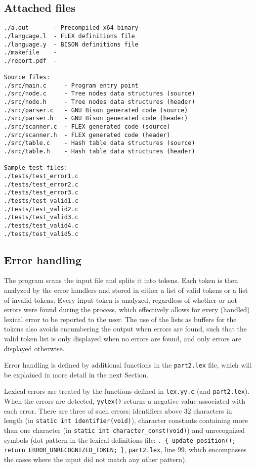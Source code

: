 \documentclass[12pt]{article}
\begin{document}
\subsection{Attached files}
\begin{lstlisting}
./a.out       - Precompiled x64 binary
./language.l  - FLEX definitions file
./language.y  - BISON definitions file
./makefile    - 
./report.pdf  - 

Source files:
./src/main.c     - Program entry point
./src/node.c     - Tree nodes data structures (source)
./src/node.h     - Tree nodes data structures (header)
./src/parser.c   - GNU Bison generated code (source)
./src/parser.h   - GNU Bison generated code (header)
./src/scanner.c  - FLEX generated code (source)
./src/scanner.h  - FLEX generated code (header)
./src/table.c    - Hash table data structures (source)
./src/table.h    - Hash table data structures (header)

Sample test files:
./tests/test_error1.c
./tests/test_error2.c
./tests/test_error3.c
./tests/test_valid1.c
./tests/test_valid2.c
./tests/test_valid3.c
./tests/test_valid4.c
./tests/test_valid5.c
\end{lstlisting}


\subsection{Error handling}
The program scans the input file and splits it into tokens. Each token is then analyzed
by the error handlers and stored in either a list of valid tokens or a list of invalid tokens.
Every input token is analyzed, regardless of whether or not errors were found during the process,
which effectively allows for every (handled) lexical error to be reported to the user. The use
of the lists as buffers for the tokens also avoids encumbering the output when errors are found, such
that the valid token list is only displayed when no errors are found, and only errors are displayed
otherwise.

Error handling is defined by additional functions in the \texttt{part2.lex} file, which will
be explained in more detail in the next Section.

Lexical errors are treated by the functions defined in \texttt{lex.yy.c} (and \texttt{part2.lex}).
When the errors are detected, \texttt{yylex()} returns a negative value associated with each error.
There are three of such errors: identifiers above 32 characters in length
(in \texttt{static int identifier(void)}), character constants containing more than one character
(in \texttt{static int character{\_}const(void)}) and unrecognized symbols (dot pattern
in the lexical definitions file: \texttt{. \{ update{\_}position();}
\texttt{return ERROR{\_}UNRECOGNIZED{\_}TOKEN; \}}, \texttt{part2.lex}, line 99, which encompasses
the cases where the input did not match any other pattern).
\end{document}
